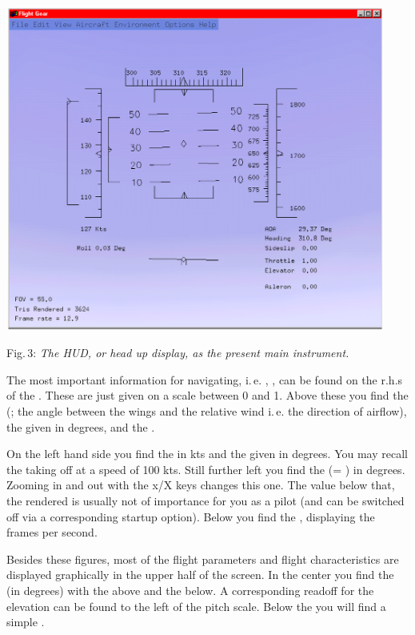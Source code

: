  \centerline{
\includegraphics[clip,width=12.5cm]{hud.eps}
}

 \noindent
Fig.\,3: \textit{The HUD, or head up display, as the present main
\FlightGear instrument.}
\medskip

The most important information for navigating, i.\,e.
, ,  can be found
on the r.h.s of the . These are just given on a scale
between 0 and 1. Above these you find the 
(; the angle between the wings and the
relative wind i.\,e. the direction of airflow), the
 given in degrees, and the .

On the left hand side you find the  in kts and the
 given in degrees. You may recall the 
taking off at a speed of 100 kts. Still further left you find the
 (= ) in degrees.
Zooming in and out with the x/X keys changes this one.
The value below that, the  rendered is
usually not of importance for you as a pilot (and can be switched
off via a corresponding startup option). Below you find the
, displaying the frames per second.

Besides these figures, most of the flight parameters and flight
characteristics are displayed graphically in the upper half of the
screen. In the center you find the  (in
degrees) with the  above and the
 below. A corresponding readoff for the
elevation can be found to the left of
the pitch scale. Below the  you will find a
simple .

